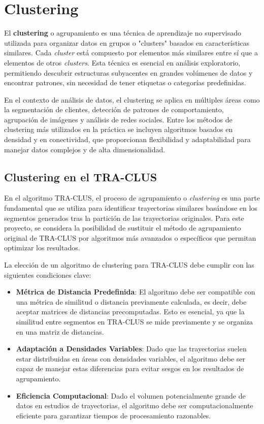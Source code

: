 \section{Clustering}

El \textbf{clustering} o agrupamiento es una técnica de aprendizaje no supervisado utilizada para organizar datos en grupos o "clusters" basados en características similares. Cada \textit{cluster} está compuesto por elementos más similares entre sí que a elementos de otros \textit{clusters}. Esta técnica es esencial en análisis exploratorio, permitiendo descubrir estructuras subyacentes en grandes volúmenes de datos y encontrar patrones, sin necesidad de tener etiquetas o categorías predefinidas.

En el contexto de análisis de datos, el clustering se aplica en múltiples áreas como la segmentación de clientes, detección de patrones de comportamiento, agrupación de imágenes y análisis de redes sociales. Entre los métodos de clustering más utilizados en la práctica se incluyen algoritmos basados en densidad y en conectividad, que proporcionan flexibilidad y adaptabilidad para manejar datos complejos y de alta dimensionalidad.

\subsection*{Clustering en el TRA-CLUS}

En el algoritmo TRA-CLUS, el proceso de agrupamiento o \textit{clustering} es una parte fundamental que se utiliza para identificar trayectorias similares basándose en los segmentos generados tras la partición de las trayectorias originales. Para este proyecto, se considera la posibilidad de sustituir el método de agrupamiento original de TRA-CLUS por algoritmos más avanzados o específicos que permitan optimizar los resultados.

La elección de un algoritmo de clustering para TRA-CLUS debe cumplir con las siguientes condiciones clave:
\begin{itemize}
    \item \textbf{Métrica de Distancia Predefinida}: El algoritmo debe ser compatible con una métrica de similitud o distancia previamente calculada, es decir, debe aceptar matrices de distancias precomputadas. Esto es esencial, ya que la similitud entre segmentos en TRA-CLUS se mide previamente y se organiza en una matriz de distancias.
    \item \textbf{Adaptación a Densidades Variables}: Dado que las trayectorias suelen estar distribuidas en áreas con densidades variables, el algoritmo debe ser capaz de manejar estas diferencias para evitar sesgos en los resultados de agrupamiento.
    \item \textbf{Eficiencia Computacional}: Dado el volumen potencialmente grande de datos en estudios de trayectorias, el algoritmo debe ser computacionalmente eficiente para garantizar tiempos de procesamiento razonables.
\end{itemize}

